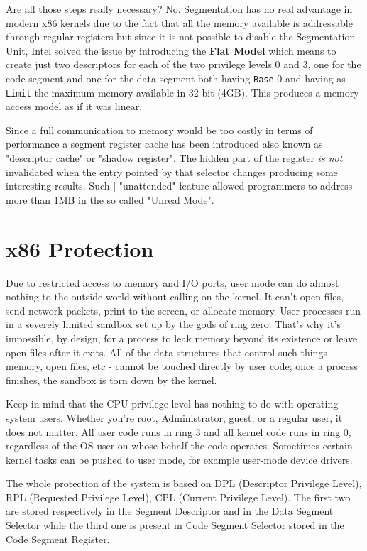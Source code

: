 \documentclass[twoside]{article}
\begin{document}
Are all those steps  really necessary? No. Segmentation has no real advantage in modern x86 kernels due to the fact that all the memory available is addressable through regular registers but since it is not possible to disable the Segmentation Unit, Intel solved the issue by introducing the \textbf{Flat Model} which means to create just two descriptors for each of the two privilege levels 0 and 3, one for the code segment and one for the data segment both having \texttt{Base} 0 and having as \texttt{Limit} the maximum memory available in 32-bit (4GB). This produces a memory access model as if it was linear.

Since  a full communication to memory would be too costly in terms of performance a segment register cache has been introduced also known as "descriptor cache" or "shadow register". The hidden part of the register \textit{is not} invalidated when the entry pointed by that selector changes producing some interesting results. Such |  "unattended" feature allowed programmers to address more than 1MB in the so called "Unreal Mode".

\section{x86 Protection}

Due to restricted access to memory and I/O ports, user mode can do almost nothing to the outside world without calling on the kernel. It can't open files, send network packets, print to the screen, or allocate memory. User processes run in a severely limited sandbox set up by the gods of ring zero. That's why it's impossible, by design, for a process to leak memory beyond its existence or leave open files after it exits. All of the data structures that control such things - memory, open files, etc - cannot be touched directly by user code; once a process finishes, the sandbox is torn down by the kernel.

Keep in mind that the CPU privilege level has nothing to do with operating system users. Whether you're root, Administrator, guest, or a regular user, it does not matter. All user code runs in ring 3 and all kernel code runs in ring 0, regardless of the OS user on whose behalf the code operates. Sometimes certain kernel tasks can be pushed to user mode, for example user-mode device drivers.

The whole protection of the system is based on DPL (Descriptor Privilege Level), RPL (Requested Privilege Level), CPL (Current Privilege Level). The first two are stored respectively in the Segment Descriptor and in the Data Segment Selector while the third one is present in Code Segment Selector stored in the Code Segment Register.
\end{document}
